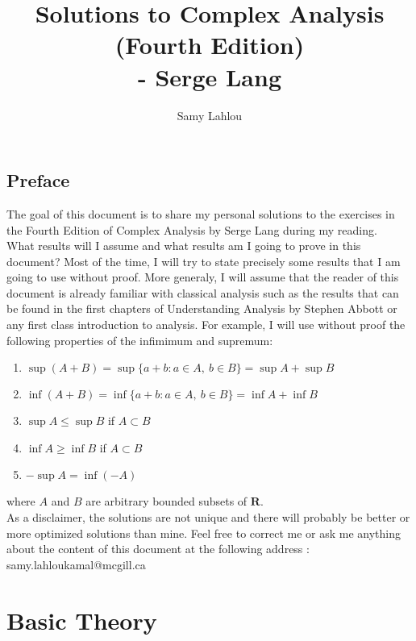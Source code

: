 \documentclass[12pt, oneside]{book}
\title{Solutions to Complex Analysis (Fourth Edition)
\\ - Serge Lang}
\author{Samy Lahlou}
\newcommand{\R}{\mathbf{R}}
\newcounter{exercise}[section] %
\begin{document}
\maketitle

\chapter*{Preface}

The goal of this document is to share my personal solutions to the exercises in the Fourth Edition of Complex Analysis by Serge Lang during my reading. \\ 
What results will I assume and what results am I going to prove in this document? Most of the time, I will try to state precisely some results that I am going to use without proof. More generaly, I will assume that the reader of this document is already familiar with classical analysis such as the results that can be found in the first chapters of Understanding Analysis by Stephen Abbott or any first class introduction to analysis. For example, I will use without proof the following properties of the infimimum and supremum:
\begin{enumerate}
    \item $\sup(A+B) = \sup\{a+b : a\in A, \ b\in B\} = \sup A + \sup B$
    \item $\inf(A+B) = \inf\{a+b : a\in A, \ b\in B\} = \inf A + \inf B$
    \item $\sup A \leq \sup B$ if $A \subset B$
    \item $\inf A \geq \inf B$ if $A \subset B$
    \item $-\sup A = \inf (-A)$
\end{enumerate}
where $A$ and $B$ are arbitrary bounded subsets of $\R$. \\
As a disclaimer, the solutions are not unique and there will probably be better or more optimized solutions than mine. Feel free to correct me or ask me anything about the content of this document at the following address : samy.lahloukamal@mcgill.ca

\tableofcontents

\part{\textbf{Basic Theory}}


\end{document}
